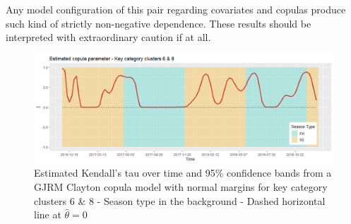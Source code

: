 Any model configuration of this pair regarding covariates and copulas produce such kind of strictly non-negative dependence. These results should be interpreted with extraordinary caution if at all.
\\



\begin{figure}[H]
\centering
  \includegraphics[width=0.95\linewidth]{figures/estimated_tau_clayton_kcc_68.png}
  \caption{Estimated Kendall's tau over time and 95\% confidence bands from a \ac{GJRM} Clayton copula model with normal margins for key category clusters 6 \& 8 - Season type in the background - Dashed horizontal line at $\hat{\theta} = 0$}
  \label{fig:estimated_tau_clayton_kcc_68}
\end{figure}

































